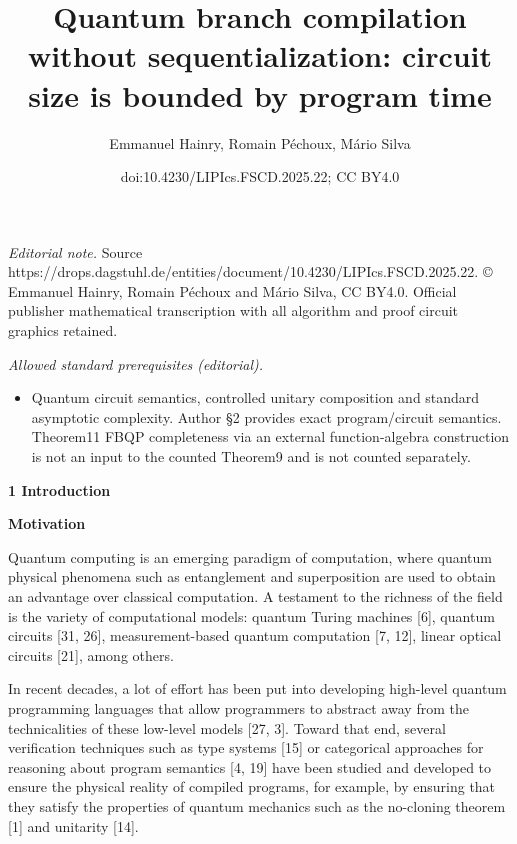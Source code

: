 \documentclass[10pt,a4paper]{amsart}
\title{Quantum branch compilation without sequentialization: circuit size is bounded by program time}
\author{Emmanuel Hainry, Romain Péchoux, Mário Silva}
\date{doi:10.4230/LIPIcs.FSCD.2025.22; CC BY4.0}
\begin{document}
\maketitle
\noindent\textit{Editorial note.} Source https://drops.dagstuhl.de/entities/document/10.4230/LIPIcs.FSCD.2025.22. © Emmanuel Hainry, Romain Péchoux and Mário Silva, CC BY4.0. Official publisher mathematical transcription with all algorithm and proof circuit graphics retained.\par\medskip
\noindent\textit{Allowed standard prerequisites (editorial).}\begin{itemize}
\item Quantum circuit semantics, controlled unitary composition and standard asymptotic complexity. Author §2 provides exact program/circuit semantics. Theorem11 FBQP completeness via an external function-algebra construction is not an input to the counted Theorem9 and is not counted separately.
\end{itemize}\medskip
 
\par\medskip\noindent\textbf{1 Introduction}\par
 
 
\par\medskip\noindent\textbf{Motivation}\par
 
 
Quantum computing is an emerging paradigm of computation, where quantum physical phenomena such as entanglement and superposition are used to obtain an advantage over classical computation. A testament to the richness of the field is the variety of computational models: quantum Turing machines [6], quantum circuits [31, 26], measurement-based quantum computation [7, 12], linear optical circuits [21], among others.\par
 
 
 
In recent decades, a lot of effort has been put into developing high-level quantum programming languages that allow programmers to abstract away from the technicalities of these low-level models [27, 3]. Toward that end, several verification techniques such as type systems [15] or categorical approaches for reasoning about program semantics [4, 19] have been studied and developed to ensure the physical reality of compiled programs, for example, by ensuring that they satisfy the properties of quantum mechanics such as the no-cloning theorem [1] and unitarity [14].\par
 
\end{document}
